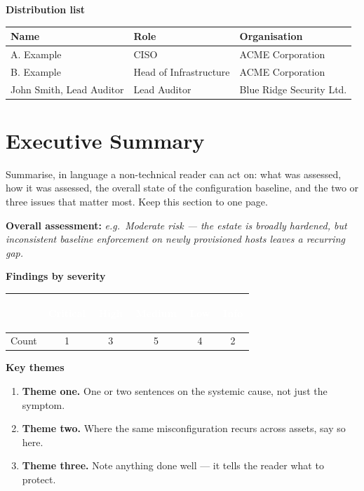 \documentclass[11pt,a4paper]{article}
\newcommand{\ClientName}{ACME Corporation}
\newcommand{\AuditorOrg}{Blue Ridge Security Ltd.}
\newcommand{\ReviewerName}{John Smith, Lead Auditor}
\newcommand{\setseverity}[1]{%
  \ifstrequal{#1}{Critical}{\colorlet{findcolor}{sevCritical}}{%
  \ifstrequal{#1}{High}{\colorlet{findcolor}{sevHigh}}{%
  \ifstrequal{#1}{Medium}{\colorlet{findcolor}{sevMedium}}{%
  \ifstrequal{#1}{Low}{\colorlet{findcolor}{sevLow}}{%
  \colorlet{findcolor}{sevInfo}}}}}}
\newcommand{\sev}[1]{\setseverity{#1}%
  \textcolor{white}{\colorbox{findcolor}{\strut\footnotesize\bfseries\,#1\,}}}
\begin{document}
\noindent\textbf{Distribution list}
\begin{longtable}{@{}l l l@{}}
\toprule
\textbf{Name} & \textbf{Role} & \textbf{Organisation} \\
\midrule\endhead
A. Example & CISO & \ClientName \\
B. Example & Head of Infrastructure & \ClientName \\
\ReviewerName & Lead Auditor & \AuditorOrg \\
\bottomrule
\end{longtable}

\newpage
\tableofcontents
\newpage

\section{Executive Summary}
Summarise, in language a non-technical reader can act on: what was assessed,
how it was assessed, the overall state of the configuration baseline, and the
two or three issues that matter most. Keep this section to one page.

\vspace{6pt}
\noindent\textbf{Overall assessment:} \emph{e.g.\ Moderate risk --- the estate is
broadly hardened, but inconsistent baseline enforcement on newly provisioned
hosts leaves a recurring gap.}

\vspace{10pt}
\noindent\textbf{Findings by severity}
\begin{center}
\begin{tabular}{@{}l c c c c c@{}}
\toprule
& \sev{Critical} & \sev{High} & \sev{Medium} & \sev{Low} & \sev{Info} \\
\midrule
Count & 1 & 3 & 5 & 4 & 2 \\
\bottomrule
\end{tabular}
\end{center}

\vspace{6pt}
\noindent\textbf{Key themes}
\begin{enumerate}
  \item \textbf{Theme one.} One or two sentences on the systemic cause, not just the symptom.
  \item \textbf{Theme two.} Where the same misconfiguration recurs across assets, say so here.
  \item \textbf{Theme three.} Note anything done well --- it tells the reader what to protect.
\end{enumerate}
\end{document}
